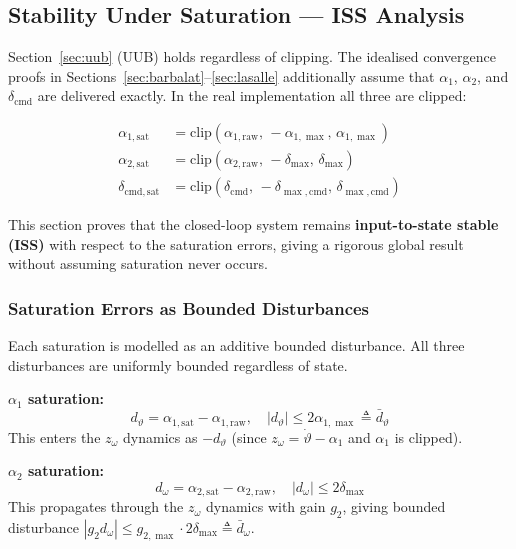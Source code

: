 \documentclass[11pt,a4paper]{article}
\theoremstyle{plain}
\theoremstyle{remark}
\newcommand{\vth}{\vartheta}
\newcommand{\zom}{z_{\omega}}
\newcommand{\clip}{\mathrm{clip}}
\newcommand{\dmax}{\delta_{\max}}
\newcommand{\dcmd}{\delta_{\mathrm{cmd}}}
\begin{document}
\subsection{Stability Under Saturation --- ISS Analysis}
\label{sec:iss}

Section~\ref{sec:uub} (UUB) holds regardless of clipping. The idealised convergence proofs in Sections~\ref{sec:barbalat}--\ref{sec:lasalle} additionally assume that $\alpha_1$, $\alpha_2$, and $\dcmd$ are delivered exactly. In the real implementation all three are clipped:

\begin{align}
  \alpha_{1,\mathrm{sat}} &= \clip(\alpha_{1,\mathrm{raw}},\,-\alpha_{1,\max},\,\alpha_{1,\max}) \\
  \alpha_{2,\mathrm{sat}} &= \clip(\alpha_{2,\mathrm{raw}},\,-\dmax,\,\dmax) \\
  \delta_{\mathrm{cmd},\mathrm{sat}} &= \clip(\dcmd,\,-\delta_{\max,\mathrm{cmd}},\,\delta_{\max,\mathrm{cmd}})
\end{align}

This section proves that the closed-loop system remains \textbf{input-to-state stable (ISS)} with respect to the saturation errors, giving a rigorous global result without assuming saturation never occurs.

\subsubsection{Saturation Errors as Bounded Disturbances}

Each saturation is modelled as an additive bounded disturbance. All three disturbances are uniformly bounded regardless of state.

\textbf{$\alpha_1$ saturation:}
\begin{equation}
  d_\vartheta = \alpha_{1,\mathrm{sat}} - \alpha_{1,\mathrm{raw}}, \quad |d_\vartheta| \leq 2\alpha_{1,\max} \triangleq \bar{d}_\vartheta
\end{equation}
This enters the $\zom$ dynamics as $-d_\vartheta$ (since $\zom = \dot\vth - \alpha_1$ and $\alpha_1$ is clipped).

\textbf{$\alpha_2$ saturation:}
\begin{equation}
  d_\omega = \alpha_{2,\mathrm{sat}} - \alpha_{2,\mathrm{raw}}, \quad |d_\omega| \leq 2\dmax
\end{equation}
This propagates through the $\zom$ dynamics with gain $g_2$, giving bounded disturbance $|g_2 d_\omega| \leq g_{2,\max}\cdot 2\dmax \triangleq \bar{d}_\omega$.
\end{document}
